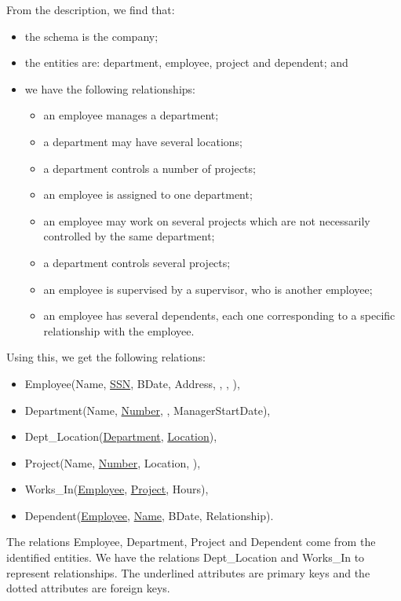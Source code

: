 \documentclass[a4paper, openany]{memoir}
\theoremstyle{definition}
\begin{document}
    \begin{answer}
        From the description, we find that:
        \begin{itemize}
            \item the schema is the company;
            \item the entities are: department, employee, project and dependent; and
            \item we have the following relationships:
            \begin{itemize}
                \item an employee manages a department;
                \item a department may have several locations;
                \item a department controls a number of projects;
                \item an employee is assigned to one department;
                \item an employee may work on several projects which are not necessarily controlled by the same department;
                \item a department controls several projects;
                \item an employee is supervised by a supervisor, who is another employee;
                \item an employee has several dependents, each one corresponding to a specific relationship with the employee.
            \end{itemize}
        \end{itemize}

        Using this, we get the following relations:
        \begin{itemize}
            \item Employee(Name, \underline{SSN}, BDate, Address, , ,  ),
            \item Department(Name, \underline{Number}, , ManagerStartDate),
            \item Dept\_Location(\underline{Department}, \underline{Location}),
            \item Project(Name, \underline{Number}, Location, ),
            \item Works\_In(\underline{Employee}, \underline{Project}, Hours),
            \item Dependent(\underline{Employee}, \underline{Name}, BDate, Relationship).
        \end{itemize}
        The relations Employee, Department, Project and Dependent come from the identified entities. We have the relations Dept\_Location and Works\_In to represent relationships. The underlined attributes are primary keys and the dotted attributes are foreign keys.
    \end{answer}
\end{document}
